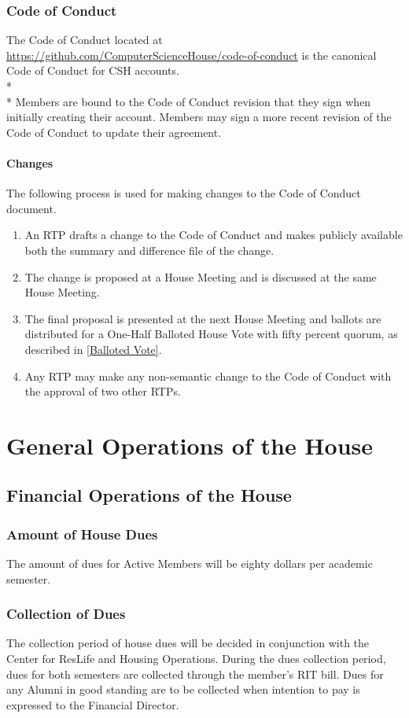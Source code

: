 \documentclass{article}
\newcommand{\article}[1]{\section{#1} \label{#1}}
\newcommand{\asection}[1]{\subsection{#1} \label{#1}}
\newcommand{\asubsection}[1]{\subsubsection{#1} \label{#1}}
\newcommand{\asubsubsection}[1]{\paragraph{#1} \label{#1}}
\begin{document}
\asubsection{Code of Conduct}
The Code of Conduct located at \url{https://github.com/ComputerScienceHouse/code-of-conduct} is the canonical Code of Conduct for CSH accounts.
\\* \\*
Members are bound to the Code of Conduct revision that they sign when initially creating their account.
Members may sign a more recent revision of the Code of Conduct to update their agreement.

\asubsubsection{Changes}
\renewcommand{\theenumi}{\alph{enumi}} %
The following process is used for making changes to the Code of Conduct document.
\begin{enumerate}
	\item An RTP drafts a change to the Code of Conduct and makes publicly available both the summary and difference file of the change.
	\item The change is proposed at a House Meeting and is discussed at the same House Meeting.
	\item The final proposal is presented at the next House Meeting and ballots are distributed for a One-Half Balloted House Vote with fifty percent quorum, as described in \ref{Balloted Vote}.
	\item Any RTP may make any non-semantic change to the Code of Conduct with the approval of two other RTPs.
\end{enumerate}

\article{General Operations of the House}

\asection{Financial Operations of the House}

\asubsection{Amount of House Dues}
The amount of dues for Active Members will be eighty dollars per academic semester.

\asubsection{Collection of Dues}
The collection period of house dues will be decided in conjunction with the Center for ResLife and Housing Operations.
During the dues collection period, dues for both semesters are collected through the member’s RIT bill.
Dues for any Alumni in good standing are to be collected when intention to pay is expressed to the Financial Director.
\end{document}
